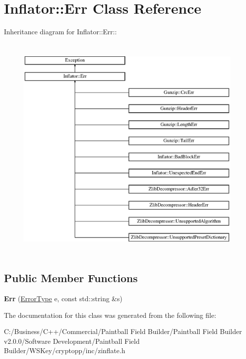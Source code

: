 \hypertarget{class_inflator_1_1_err}{
\section{Inflator::Err Class Reference}
\label{class_inflator_1_1_err}
}
Inheritance diagram for Inflator::Err::\begin{figure}[H]
\begin{center}
\leavevmode
\includegraphics[height=11.3898cm]{class_inflator_1_1_err}
\end{center}
\end{figure}
\subsection*{Public Member Functions}
\begin{DoxyCompactItemize}
\item 
\hypertarget{class_inflator_1_1_err_a5b05977af50a38a468e65abb27be2cea}{
{\bfseries Err} (\hyperlink{class_exception_a8e53909d979479380e0274807c074c0a}{ErrorType} e, const std::string \&s)}
\label{class_inflator_1_1_err_a5b05977af50a38a468e65abb27be2cea}

\end{DoxyCompactItemize}


The documentation for this class was generated from the following file:\begin{DoxyCompactItemize}
\item 
C:/Business/C++/Commercial/Paintball Field Builder/Paintball Field Builder v2.0.0/Software Development/Paintball Field Builder/WSKey/cryptopp/inc/zinflate.h\end{DoxyCompactItemize}
